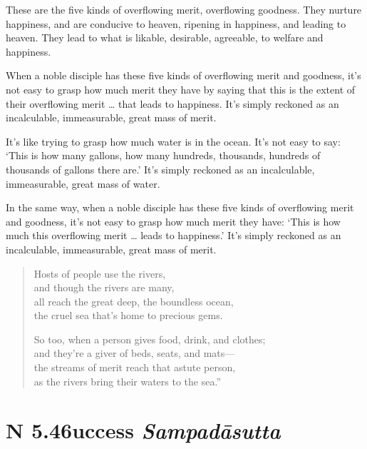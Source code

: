 \documentclass[12pt,openany]{book}%
\newcommand*{\suttatitleacronym}[1]{\smaller[2]{#1}\vspace*{.3em}}
\newcommand*{\suttatitletranslation}[1]{\linebreak{#1}}
\newcommand*{\suttatitleroot}[1]{\linebreak\smaller[2]\itshape{#1}}
\newcommand*{\tocacronym}[1]{\hspace*{-3.3em}{#1}\quad}
\newcommand*{\toctranslation}[1]{#1}
\newcommand*{\tocroot}[1]{(\textit{#1})}
\begin{document}
These are the five kinds of overflowing merit, overflowing goodness. They nurture happiness, and are conducive to heaven, ripening in happiness, and leading to heaven. They lead to what is likable, desirable, agreeable, to welfare and happiness. 

When a noble disciple has these five kinds of overflowing merit and goodness, it’s not easy to grasp how much merit they have by saying that this is the extent of their overflowing merit … that leads to happiness. It’s simply reckoned as an incalculable, immeasurable, great mass of merit. 

It’s like trying to grasp how much water is in the ocean. It’s not easy to say: ‘This is how many gallons, how many hundreds, thousands, hundreds of thousands of gallons there are.’ It’s simply reckoned as an incalculable, immeasurable, great mass of water. 

In the same way, when a noble disciple has these five kinds of overflowing merit and goodness, it’s not easy to grasp how much merit they have: ‘This is how much this overflowing merit … leads to happiness.’ It’s simply reckoned as an incalculable, immeasurable, great mass of merit. 

\begin{verse}%
Hosts of people use the rivers, \\
and though the rivers are many, \\
all reach the great deep, the boundless ocean, \\
the cruel sea that’s home to precious gems. 

So too, when a person gives food, drink, and clothes; \\
and they’re a giver of beds, seats, and mats—\\
the streams of merit reach that astute person, \\
as the rivers bring their waters to the sea.” 

%
\end{verse}

%
\section*{{\suttatitleacronym AN 5.46}{\suttatitletranslation Success }{\suttatitleroot Sampadāsutta}}
\addcontentsline{toc}{section}{\tocacronym{AN 5.46} \toctranslation{Success } \tocroot{Sampadāsutta}}
\end{document}

